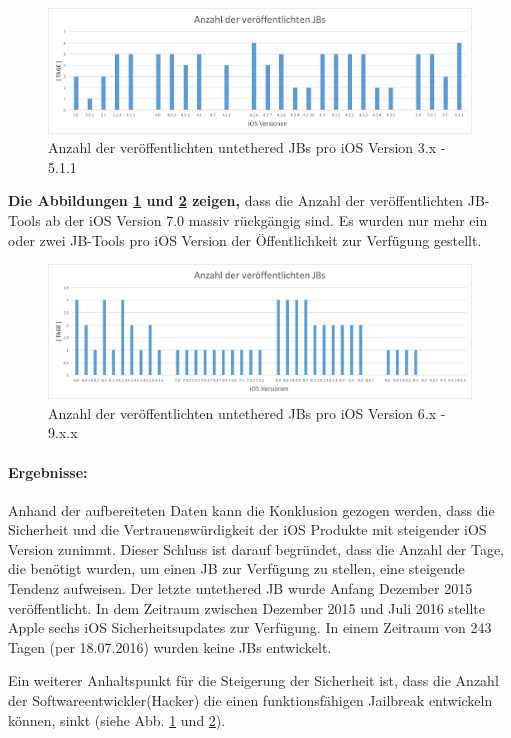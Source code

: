 \begin{figure}[hp!]
        \centering
                \includegraphics[scale=0.5]{Bilder/iOSJB1.png}
        \caption{Anzahl der veröffentlichten untethered JBs pro iOS Version 3.x - 5.1.1 \protect\footnotemark}
        \label{fig:AnalyseAnzahliOSJB1}
\end{figure}
{}

\textbf{Die Abbildungen \ref{fig:AnalyseAnzahliOSJB1} und \ref{fig:AnalyseAnzahliOSJB2} zeigen,} dass die Anzahl der veröffentlichten JB-Tools ab der iOS Version 7.0 massiv rückgängig sind. Es wurden nur mehr ein oder zwei JB-Tools pro iOS Version der Öffentlichkeit zur Verfügung gestellt. 

\begin{figure}[hp!]
        \centering
                \includegraphics[scale=0.5]{Bilder/iOSJB2.png}
        \caption{Anzahl der veröffentlichten untethered JBs pro iOS Version 6.x - 9.x.x \protect\footnotemark}
        \label{fig:AnalyseAnzahliOSJB2}
\end{figure}
{}

\paragraph{Ergebnisse:} Anhand der aufbereiteten Daten kann die Konklusion gezogen werden, dass die Sicherheit und die Vertrauenswürdigkeit der iOS Produkte mit steigender iOS Version zunimmt. Dieser Schluss ist darauf begründet, dass die Anzahl der Tage, die benötigt wurden, um einen JB zur Verfügung zu stellen, eine steigende Tendenz aufweisen. Der letzte untethered JB wurde Anfang Dezember 2015 veröffentlicht.
In dem Zeitraum zwischen Dezember 2015 und Juli 2016 stellte Apple sechs iOS Sicherheitsupdates zur Verfügung. In einem Zeitraum von 243 Tagen (per 18.07.2016) wurden keine JBs entwickelt.\par 
Ein weiterer Anhaltspunkt für die Steigerung der Sicherheit ist, dass die Anzahl der Softwareentwickler(Hacker) die einen funktionsfähigen Jailbreak entwickeln können, sinkt  (siehe Abb. \ref{fig:AnalyseAnzahliOSJB1} und \ref{fig:AnalyseAnzahliOSJB2}). \par 

